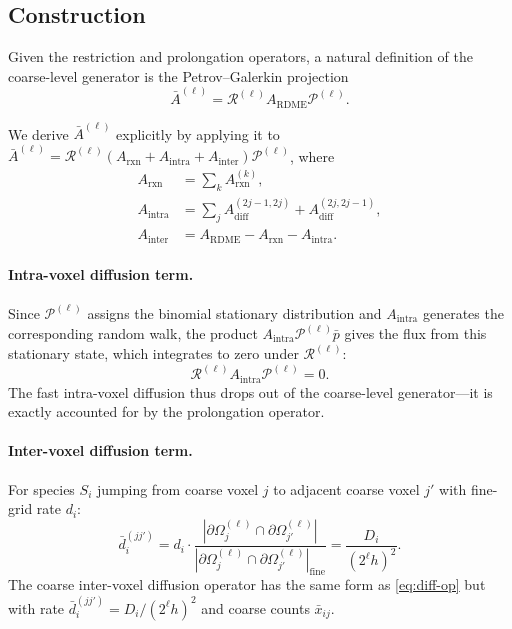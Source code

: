\documentclass[review,onefignum,onetabnum]{siamart171218}
\newcommand{\calR}{\mathcal{R}}
\newcommand{\calP}{\mathcal{P}}
\begin{document}
\subsection{Construction}

Given the restriction and prolongation operators, a natural
definition of the coarse-level generator is the Petrov--Galerkin
projection
\begin{equation}
  \label{eq:coarse-gen}
  \bar{A}^{(\ell)} = \calR^{(\ell)} A_{\mathrm{RDME}} \calP^{(\ell)}.
\end{equation}

We derive $\bar{A}^{(\ell)}$ explicitly by applying it to
$\bar{A}^{(\ell)} = \calR^{(\ell)} (A_{\mathrm{rxn}} + A_{\mathrm{intra}} + A_{\mathrm{inter}}) \calP^{(\ell)}$,
where
\begin{align}
  A_{\mathrm{rxn}} &= \textstyle\sum_k A_{\mathrm{rxn}}^{(k)},\\
  A_{\mathrm{intra}} &= \textstyle\sum_j A_{\mathrm{diff}}^{(2j-1,2j)} + A_{\mathrm{diff}}^{(2j,2j-1)},\\
  A_{\mathrm{inter}} &= A_{\mathrm{RDME}} - A_{\mathrm{rxn}} - A_{\mathrm{intra}}.
\end{align}

\paragraph{Intra-voxel diffusion term.}
Since $\calP^{(\ell)}$ assigns the binomial stationary
distribution and $A_{\mathrm{intra}}$ generates the corresponding
random walk, the product $A_{\mathrm{intra}} \calP^{(\ell)}
\bar{p}$ gives the flux from this stationary state, which
integrates to zero under $\calR^{(\ell)}$:
\begin{equation}
  \label{eq:intra-zero}
  \calR^{(\ell)} A_{\mathrm{intra}} \calP^{(\ell)} = 0.
\end{equation}
The fast intra-voxel diffusion thus drops out of the
coarse-level generator---it is exactly accounted for by
the prolongation operator.

\paragraph{Inter-voxel diffusion term.}
For species $S_i$ jumping from coarse voxel $j$ to adjacent
coarse voxel $j'$ with fine-grid rate $d_i$:
\begin{equation}
  \label{eq:coarse-diff-rate}
  \bar{d}_i^{(jj')} = d_i \cdot \frac{|\partial\Omega_j^{(\ell)} \cap \partial\Omega_{j'}^{(\ell)}|}{|\partial\Omega_j^{(\ell)} \cap \partial\Omega_{j'}^{(\ell)}|_{\mathrm{fine}}}
  = \frac{D_i}{(2^{\ell}h)^2}.
\end{equation}
The coarse inter-voxel diffusion operator has the same form as
\eqref{eq:diff-op} but with rate $\bar{d}_i^{(jj')} = D_i/(2^\ell h)^2$
and coarse counts $\bar{x}_{ij}$.
\end{document}
